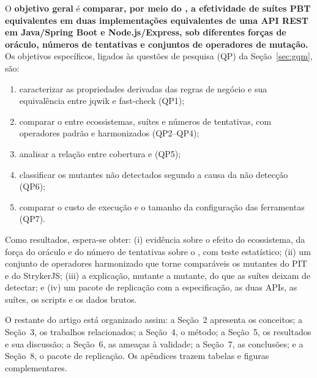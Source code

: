 O \textbf{objetivo geral} é \textbf{comparar, por meio do \ms{}, a efetividade de suítes PBT equivalentes em duas implementações equivalentes de uma API REST em Java/Spring Boot e Node.js/Express, sob diferentes forças de oráculo, números de tentativas e conjuntos de operadores de mutação.} Os objetivos específicos, ligados às questões de pesquisa (QP) da Seção~\ref{sec:gqm}, são:
\begin{enumerate}[label=\textbf{OE\arabic*}, leftmargin=1.6cm, itemsep=0pt, topsep=2pt]
  \item caracterizar as propriedades derivadas das regras de negócio e sua equivalência entre jqwik e fast-check (QP1);
  \item comparar o \ms{} entre ecossistemas, suítes e números de tentativas, com operadores padrão e harmonizados (QP2--QP4);
  \item analisar a relação entre cobertura e \ms{} (QP5);
  \item classificar os mutantes não detectados segundo a causa da não detecção (QP6);
  \item comparar o custo de execução e o tamanho da configuração das ferramentas (QP7).
\end{enumerate}

Como resultados, espera-se obter: (i) evidência sobre o efeito do ecossistema, da força do oráculo e do número de tentativas sobre o \ms{}, com teste estatístico; (ii) um conjunto de operadores harmonizado que torne comparáveis os mutantes do PIT e do StrykerJS; (iii) a explicação, mutante a mutante, do que as suítes deixam de detectar; e (iv) um pacote de replicação com a especificação, as duas APIs, as suítes, os scripts e os dados brutos.

O restante do artigo está organizado assim: a Seção~2 apresenta os conceitos; a Seção~3, os trabalhos relacionados; a Seção~4, o método; a Seção~5, os resultados e sua discussão; a Seção~6, as ameaças à validade; a Seção~7, as conclusões; e a Seção~8, o pacote de replicação. Os apêndices trazem tabelas e figuras complementares.
